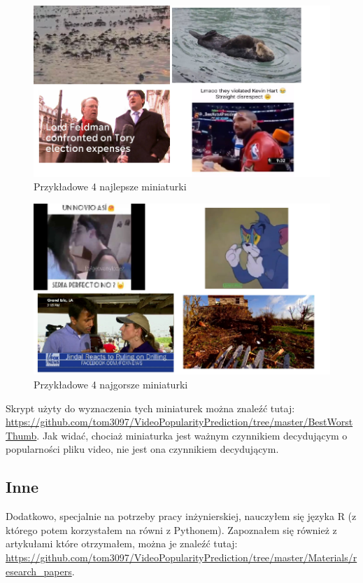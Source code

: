 \documentclass{article}
\begin{document}
\begin{figure}[H]
\caption{Przykładowe 4 najlepsze miniaturki}
\centering
\includegraphics[scale=0.7]{bestThumbs}
\end{figure}

\begin{figure}[H]
\caption{Przykładowe 4 najgorsze miniaturki}
\centering
\includegraphics[scale=0.7]{worstThumbs}
\end{figure}

Skrypt użyty do wyznaczenia tych miniaturek można znaleźć tutaj: \url{https://github.com/tom3097/VideoPopularityPrediction/tree/master/BestWorstThumb}. Jak widać, chociaż miniaturka jest ważnym czynnikiem decydującym o popularności pliku video, nie jest ona czynnikiem decydującym.

\subsection{Inne}
Dodatkowo, specjalnie na potrzeby pracy inżynierskiej, nauczyłem się języka R (z którego potem korzystałem na równi z Pythonem). Zapoznałem się również z artykułami które otrzymałem, można je znaleźć tutaj: \url{https://github.com/tom3097/VideoPopularityPrediction/tree/master/Materials/research_papers}.
\end{document}
